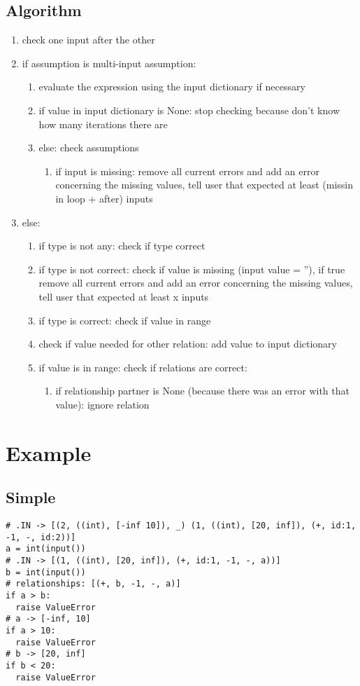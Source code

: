 \documentclass[11pt]{article}
\begin{document}
\subsection{Algorithm}

\begin{enumerate}
    \item check one input after the other
    \item if assumption is multi-input assumption:
    \begin{enumerate}
        \item evaluate the expression using the input dictionary if necessary
        \item if value in input dictionary is None: stop checking because don't know how many iterations there are
        \item else: check assumptions
        \begin{enumerate}
            \item if input is missing: remove all current errors and add an error concerning the missing values, tell user that expected at least (missin in loop + after) inputs
        \end{enumerate}
    \end{enumerate}
    \item else:
    \begin{enumerate}
        \item if type is not any: check if type correct
        \item if type is not correct: check if value is missing (input value = ''), if true remove all current errors and add an error concerning the missing values, tell user that expected at least x inputs
        \item if type is correct: check if value in range
        \item check if value needed for other relation: add value to input dictionary
        \item if value is in range: check if relations are correct:
        \begin{enumerate}
            \item if relationship partner is None (because there was an error with that value): ignore relation
        \end{enumerate}
    \end{enumerate}
\end{enumerate}

\section{Example}

\subsection{Simple}

\begin{lstlisting}
# .IN -> [(2, ((int), [-inf 10]), _) (1, ((int), [20, inf]), (+, id:1, -1, -, id:2))]
a = int(input())
# .IN -> [(1, ((int), [20, inf]), (+, id:1, -1, -, a))]
b = int(input())
# relationships: [(+, b, -1, -, a)]
if a > b:
  raise ValueError
# a -> [-inf, 10]
if a > 10:
  raise ValueError
# b -> [20, inf]
if b < 20:
  raise ValueError
\end{lstlisting}
\end{document}
